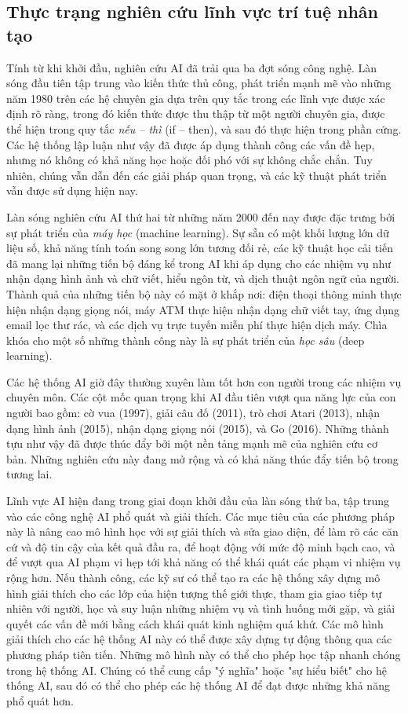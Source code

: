 \subsection{Thực trạng nghiên cứu lĩnh vực trí tuệ nhân tạo}
Tính từ khi khởi đầu, nghiên cứu AI đã trải qua ba đợt sóng công nghệ. Làn sóng đầu tiên tập trung vào kiến thức thủ công, phát triển mạnh mẽ vào những năm 1980 trên các hệ chuyên gia dựa trên quy tắc trong các lĩnh vực được xác định rõ ràng, trong đó kiến thức được thu thập từ một người chuyên gia, được thể hiện trong quy tắc \textit{nếu – thì} (if – then), và sau đó thực hiện trong phần cứng. Các hệ thống lập luận như vậy đã được áp dụng thành công các vấn đề hẹp, nhưng nó không có khả năng học hoặc đối phó với sự không chắc chắn. Tuy nhiên, chúng vẫn dẫn đến các giải pháp quan trọng, và các kỹ thuật phát triển vẫn được sử dụng hiện nay.\par
Làn sóng nghiên cứu AI thứ hai từ những năm 2000 đến nay được đặc trưng bởi sự phát triển của \textit{máy học} (machine learning). Sự sẵn có một khối lượng lớn dữ liệu số, khả năng tính toán song song lớn tương đối rẻ, các kỹ thuật học cải tiến đã mang lại những tiến bộ đáng kể trong AI khi áp dụng cho các nhiệm vụ như nhận dạng hình ảnh và chữ viết, hiểu ngôn từ, và dịch thuật ngôn ngữ của người. Thành quả của những tiến bộ này có mặt ở khắp nơi: điện thoại thông minh thực hiện nhận dạng giọng nói, máy ATM thực hiện nhận dạng chữ viết tay, ứng dụng email lọc thư rác, và các dịch vụ trực tuyến miễn phí thực hiện dịch máy. Chìa khóa cho một số những thành công này là sự phát triển của \textit{học sâu} (deep learning).\par
Các hệ thống AI giờ đây thường xuyên làm tốt hơn con người trong các nhiệm vụ chuyên môn. Các cột mốc quan trọng khi AI đầu tiên vượt qua năng lực của con người bao gồm: cờ vua (1997), giải câu đố (2011), trò chơi Atari (2013), nhận dạng hình ảnh (2015), nhận dạng giọng nói (2015), và Go (2016). Những thành tựu như vậy đã được thúc đẩy bởi một nền tảng mạnh mẽ của nghiên cứu cơ bản. Những nghiên cứu này đang mở rộng và có khả năng thúc đẩy tiến bộ trong tương lai.\par
Lĩnh vực AI hiện đang trong giai đoạn khởi đầu của làn sóng thứ ba, tập trung vào các công nghệ AI phổ quát và giải thích. Các mục tiêu của các phương pháp này là nâng cao mô hình học với sự giải thích và sửa giao diện, để làm rõ các căn cứ và độ tin cậy của kết quả đầu ra, để hoạt động với mức độ minh bạch cao, và để vượt qua AI phạm vi hẹp tới khả năng có thể khái quát các phạm vi nhiệm vụ rộng hơn. Nếu thành công, các kỹ sư có thể tạo ra các hệ thống xây dựng mô hình giải thích cho các lớp của hiện tượng thế giới thực, tham gia giao tiếp tự nhiên với người, học và suy luận những nhiệm vụ và tình huống mới gặp, và giải quyết các vấn đề mới bằng cách khái quát kinh nghiệm quá khứ. Các mô hình giải thích cho các hệ thống AI này có thể được xây dựng tự động thông qua các phương pháp tiên tiến. Những mô hình này có thể cho phép học tập nhanh chóng trong hệ thống AI. Chúng có thể cung cấp "ý nghĩa" hoặc "sự hiểu biết" cho hệ thống AI, sau đó có thể cho phép các hệ thống AI để đạt được những khả năng phổ quát hơn.\par

